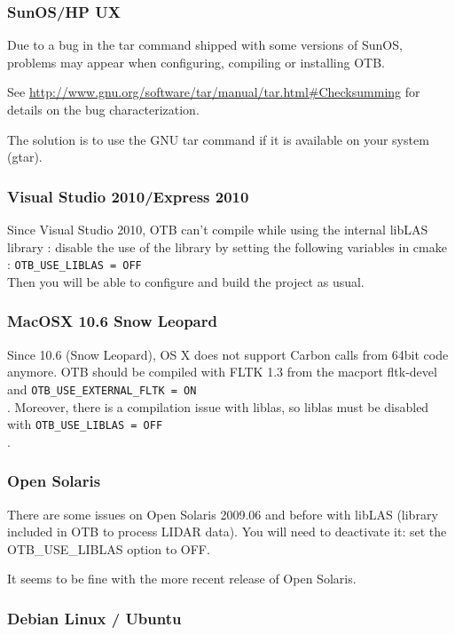 \subsubsection{SunOS/HP UX}
Due to a bug in the tar command shipped with some versions of SunOS,
problems may appear when configuring, compiling or installing OTB.

See \url{http://www.gnu.org/software/tar/manual/tar.html#Checksumming} for
details on the bug characterization.

The solution is to use the GNU tar command if it is available on your
system (gtar).

\subsubsection{Visual Studio 2010/Express 2010}
Since Visual Studio 2010, OTB can't compile while using the internal libLAS library : disable the use of the library by setting
the following variables in cmake :  \texttt{OTB\_USE\_LIBLAS = OFF}\\
Then you will be able to configure and build the project as usual.

\subsubsection{MacOSX 10.6 Snow Leopard}
Since 10.6 (Snow Leopard), OS X does not support Carbon calls from 64bit code anymore. OTB should be compiled with FLTK 1.3 from the macport fltk-devel and \texttt{OTB\_USE\_EXTERNAL\_FLTK = ON}\\. Moreover, there is a compilation issue with liblas, so liblas must be disabled with \texttt{OTB\_USE\_LIBLAS = OFF}\\.

\subsubsection{Open Solaris}
There are some issues on Open Solaris 2009.06 and before with libLAS (library included
in OTB to process LIDAR data). You will need to deactivate it: set the
OTB\_USE\_LIBLAS option to OFF.

It seems to be fine with the more recent release of Open Solaris.

\subsubsection{Debian Linux / Ubuntu}

